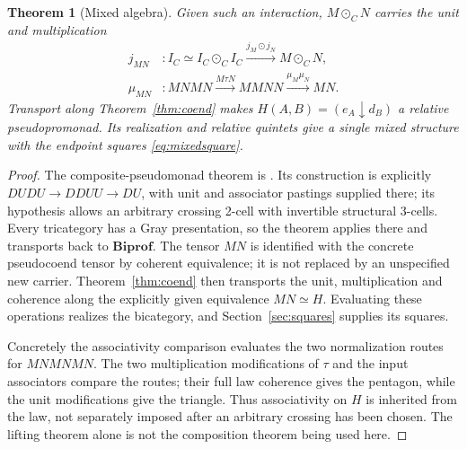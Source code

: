 \documentclass[11pt]{article}
\newtheorem{theorem}{Theorem}[section]
\theoremstyle{definition}
\newcommand{\Biprof}{\mathbf{Biprof}}
\begin{document}
\begin{theorem}[Mixed algebra]\label{thm:mixed}
Given such an interaction, $M\odot_C N$ carries the unit and multiplication
\begin{align}
 j_{MN}&:I_C\simeq I_C\odot_C I_C
       \xrightarrow{j_M\odot j_N}M\odot_C N,\label{eq:unitMN}\\
 \mu_{MN}&:MNMN\xrightarrow{M\tau N}MMNN
            \xrightarrow{\mu_M\mu_N}MN.\label{eq:multMN}
\end{align}
Transport along Theorem~\ref{thm:coend} makes $H(A,B)=(e_A\downarrow d_B)$
a relative pseudopromonad. Its realization and relative quintets give a
single mixed structure with the endpoint squares \eqref{eq:mixedsquare}.
\end{theorem}
\begin{proof}
The composite-pseudomonad theorem is
\cite[Theorem 5.1, pp.\ 101--102]{Marmolejo}. Its construction is explicitly
$DUDU\to DDUU\to DU$, with unit and associator pastings supplied there; its
hypothesis allows an arbitrary crossing 2-cell with invertible structural
3-cells. Every tricategory has a Gray presentation, so the theorem applies
there and transports back to $\Biprof$. The tensor $MN$ is identified with
the concrete pseudocoend tensor by coherent equivalence; it is not replaced
by an unspecified new carrier. Theorem~\ref{thm:coend} then transports the
unit, multiplication and coherence along the explicitly given equivalence
$MN\simeq H$. Evaluating these operations realizes the bicategory, and
Section~\ref{sec:squares} supplies its squares.

Concretely the associativity comparison evaluates the two normalization
routes for $MNMNMN$. The two multiplication modifications of $\tau$ and
the input associators compare the routes; their full law coherence gives
the pentagon, while the unit modifications give the triangle. Thus
associativity on $H$ is inherited from the law, not separately imposed after
an arbitrary crossing has been chosen. The lifting theorem
\cite[Theorem 4.5]{GambinoLobbia} alone is not the composition theorem being
used here.
\end{proof}
\end{document}

